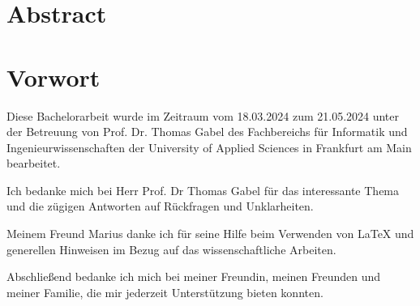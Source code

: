 \ifdefined\ThesisLanguageIsEnglish
\chapter*{Abstract}
\else
\chapter*{Vorwort}
\fi
\label{ch:Abstract}

Diese Bachelorarbeit wurde im Zeitraum vom 18.03.2024 zum 21.05.2024 unter der Betreuung von Prof. Dr. Thomas Gabel des Fachbereichs für Informatik und Ingenieurwissenschaften der University of Applied Sciences in Frankfurt am Main bearbeitet.

\hspace{8mm}

\noindent Ich bedanke mich bei Herr Prof. Dr Thomas Gabel für das interessante Thema und die zügigen Antworten auf Rückfragen und Unklarheiten.

\hspace{8mm}

\noindent Meinem Freund Marius danke ich für seine Hilfe beim Verwenden von LaTeX und generellen Hinweisen im Bezug auf das wissenschaftliche Arbeiten.

\hspace{8mm}

\noindent Abschließend bedanke ich mich bei meiner Freundin, meinen Freunden und meiner Familie, die mir jederzeit Unterstützung bieten konnten.